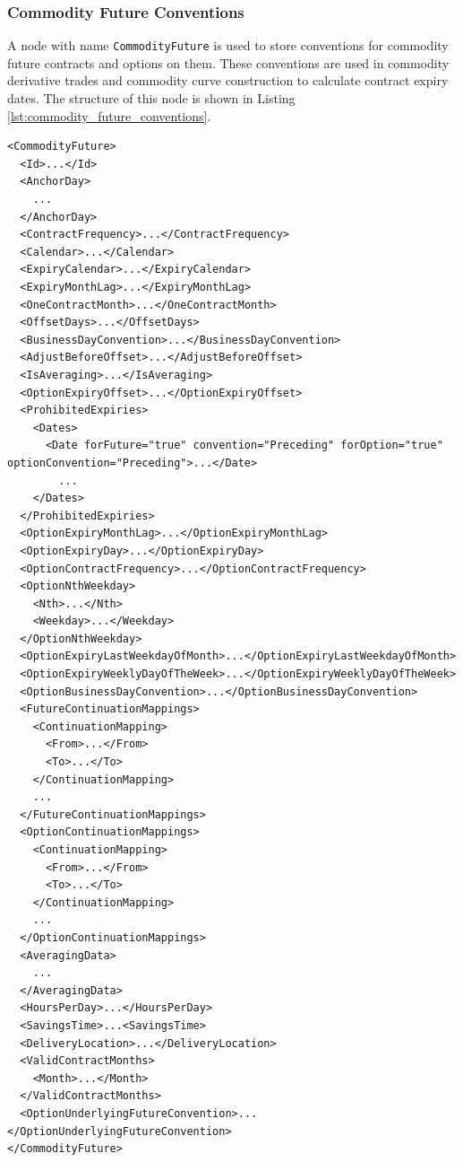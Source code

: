 \subsubsection{Commodity Future Conventions}
\label{sec:commodity_future_conventions}
A node with name \lstinline!CommodityFuture! is used to store conventions for commodity future contracts and options on them. These conventions are used in commodity derivative trades and commodity curve construction to calculate contract expiry dates. The structure of this node is shown in Listing \ref{lst:commodity_future_conventions}.

\begin{listing}[h!]
\begin{verbatim}
<CommodityFuture>
  <Id>...</Id>
  <AnchorDay>
    ...
  </AnchorDay>
  <ContractFrequency>...</ContractFrequency>
  <Calendar>...</Calendar>
  <ExpiryCalendar>...</ExpiryCalendar>
  <ExpiryMonthLag>...</ExpiryMonthLag>
  <OneContractMonth>...</OneContractMonth>
  <OffsetDays>...</OffsetDays>
  <BusinessDayConvention>...</BusinessDayConvention>
  <AdjustBeforeOffset>...</AdjustBeforeOffset>
  <IsAveraging>...</IsAveraging>
  <OptionExpiryOffset>...</OptionExpiryOffset>
  <ProhibitedExpiries>
    <Dates>
      <Date forFuture="true" convention="Preceding" forOption="true" optionConvention="Preceding">...</Date>
        ...
    </Dates>
  </ProhibitedExpiries>
  <OptionExpiryMonthLag>...</OptionExpiryMonthLag>
  <OptionExpiryDay>...</OptionExpiryDay>
  <OptionContractFrequency>...</OptionContractFrequency>
  <OptionNthWeekday>
    <Nth>...</Nth>
    <Weekday>...</Weekday>
  </OptionNthWeekday>
  <OptionExpiryLastWeekdayOfMonth>...</OptionExpiryLastWeekdayOfMonth>
  <OptionExpiryWeeklyDayOfTheWeek>...</OptionExpiryWeeklyDayOfTheWeek>
  <OptionBusinessDayConvention>...</OptionBusinessDayConvention>
  <FutureContinuationMappings>
    <ContinuationMapping>
      <From>...</From>
      <To>...</To>
    </ContinuationMapping>
    ...
  </FutureContinuationMappings>
  <OptionContinuationMappings>
    <ContinuationMapping>
      <From>...</From>
      <To>...</To>
    </ContinuationMapping>
    ...
  </OptionContinuationMappings>
  <AveragingData>
    ...
  </AveragingData>
  <HoursPerDay>...</HoursPerDay>
  <SavingsTime>...<SavingsTime>
  <DeliveryLocation>...</DeliveryLocation>
  <ValidContractMonths>
  	<Month>...</Month>
  </ValidContractMonths>
  <OptionUnderlyingFutureConvention>...</OptionUnderlyingFutureConvention>
</CommodityFuture>
\end{verbatim}
\caption{Commodity future conventions}
\label{lst:commodity_future_conventions}
\end{listing}

